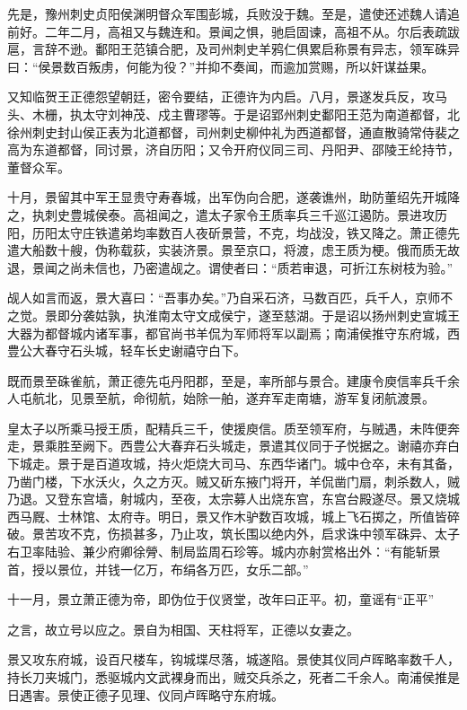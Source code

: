\documentclass[12pt,UTF8]{ctexbook}
\begin{document}
先是，豫州刺史贞阳侯渊明督众军围彭城，兵败没于魏。至是，遣使还述魏人请追前好。二年二月，高祖又与魏连和。景闻之惧，驰启固谏，高祖不从。尔后表疏跋扈，言辞不逊。鄱阳王范镇合肥，及司州刺史羊鸦仁俱累启称景有异志，领军硃异曰：“侯景数百叛虏，何能为役？”并抑不奏闻，而逾加赏赐，所以奸谋益果。

又知临贺王正德怨望朝廷，密令要结，正德许为内启。八月，景遂发兵反，攻马头、木栅，执太守刘神茂、戍主曹璆等。于是诏郢州刺史鄱阳王范为南道都督，北徐州刺史封山侯正表为北道都督，司州刺史柳仲礼为西道都督，通直散骑常侍裴之高为东道都督，同讨景，济自历阳；又令开府仪同三司、丹阳尹、邵陵王纶持节，董督众军。

十月，景留其中军王显贵守寿春城，出军伪向合肥，遂袭谯州，助防董绍先开城降之，执刺史豊城侯泰。高祖闻之，遣太子家令王质率兵三千巡江遏防。景进攻历阳，历阳太守庄铁遣弟均率数百人夜斫景营，不克，均战没，铁又降之。萧正德先遣大船数十艘，伪称载荻，实装济景。景至京口，将渡，虑王质为梗。俄而质无故退，景闻之尚未信也，乃密遣觇之。谓使者曰：“质若审退，可折江东树枝为验。”

觇人如言而返，景大喜曰：“吾事办矣。”乃自采石济，马数百匹，兵千人，京师不之觉。景即分袭姑孰，执淮南太守文成侯宁，遂至慈湖。于是诏以扬州刺史宣城王大器为都督城内诸军事，都官尚书羊侃为军师将军以副焉；南浦侯推守东府城，西豊公大春守石头城，轻车长史谢禧守白下。

既而景至硃雀航，萧正德先屯丹阳郡，至是，率所部与景合。建康令庾信率兵千余人屯航北，见景至航，命彻航，始除一舶，遂弃军走南塘，游军复闭航渡景。

皇太子以所乘马授王质，配精兵三千，使援庾信。质至领军府，与贼遇，未阵便奔走，景乘胜至阙下。西豊公大春弃石头城走，景遣其仪同于子悦据之。谢禧亦弃白下城走。景于是百道攻城，持火炬烧大司马、东西华诸门。城中仓卒，未有其备，乃凿门楼，下水沃火，久之方灭。贼又斫东掖门将开，羊侃凿门扇，刺杀数人，贼乃退。又登东宫墙，射城内，至夜，太宗募人出烧东宫，东宫台殿遂尽。景又烧城西马厩、士林馆、太府寺。明日，景又作木驴数百攻城，城上飞石掷之，所值皆碎破。景苦攻不克，伤损甚多，乃止攻，筑长围以绝内外，启求诛中领军硃异、太子右卫率陆验、兼少府卿徐膋、制局监周石珍等。城内亦射赏格出外：“有能斩景首，授以景位，并钱一亿万，布绢各万匹，女乐二部。”

十一月，景立萧正德为帝，即伪位于仪贤堂，改年曰正平。初，童谣有“正平”

之言，故立号以应之。景自为相国、天柱将军，正德以女妻之。

景又攻东府城，设百尺楼车，钩城堞尽落，城遂陷。景使其仪同卢晖略率数千人，持长刀夹城门，悉驱城内文武裸身而出，贼交兵杀之，死者二千余人。南浦侯推是日遇害。景使正德子见理、仪同卢晖略守东府城。
\end{document}
